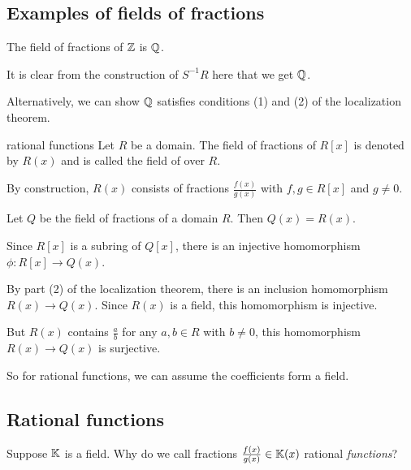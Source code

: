 \documentclass[12pt,letterpaper]{report}
\begin{document}
\pagebreak
\subsection{Examples of fields of fractions}

\begin{lem}{}{}
  The field of fractions of $\mathbb{Z}$ is $\mathbb{Q}$.
\end{lem}

\begin{thmproof}
  It is clear from the construction of $S^{-1}R$ here that we get $\mathbb{Q}$.

  Alternatively, we can show $\mathbb{Q}$ satisfies conditions (1) and (2) of the localization theorem.
\end{thmproof}

\begin{defn}{rational functions}{}
  Let $R$ be a domain.
  The field of fractions of $R[x]$ is denoted by $R(x)$ and is called the field of
   over $R$.
\end{defn}

By construction, $R(x)$ consists of fractions $\frac{f(x)}{g(x)}$ with $f, g \in R[x]$ and
$g \neq 0$.

\begin{lem}{}{}
  Let $Q$ be the field of fractions of a domain $R$.
  Then $Q(x) = R(x)$.
\end{lem}

\begin{thmproof}
  Since $R[x]$ is a subring of $Q[x]$, there is an injective homomorphism
  $\phi \colon R[x] \to Q(x)$.

  By part (2) of the localization theorem, there is an inclusion homomorphism $R(x) \to Q(x)$.
  Since $R(x)$ is a field, this homomorphism is injective.

  But $R(x)$ contains $\frac{a}{b}$ for any $a, b \in R$ with $b \neq 0$, this homomorphism
  $R(x) \to Q(x)$ is surjective.
\end{thmproof}

So for rational functions, we can assume the coefficients form a field.

\pagebreak
\subsection{Rational functions}

Suppose $\mathbb{K}$ is a field.
Why do we call fractions $\frac{f(x)}{g(x)} \in \mathbb{K}(x)$ rational \emph{functions}?
\end{document}
